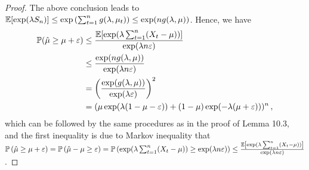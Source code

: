 \begin{proof}
    The above conclusion leads to $\mathbb{E}[\exp(\lambda S_{n})] \leq \exp\left(\sum_{t=1}^n g(\lambda, \mu_t)\right) \leq \exp(n g(\lambda, \mu))$.
    Hence, we have
    \begin{equation*}
        \begin{aligned}
            \mathbb{P}(\hat{\mu} \geq \mu+\varepsilon)
            &\leq \frac{\mathbb{E}[\exp(\lambda \sum_{t=1}^n (X_t - \mu))]}{\exp(\lambda n \varepsilon)}\\
            &\leq \frac{\exp(n g(\lambda, \mu))}{\exp(\lambda n \varepsilon)}\\
            &= \left(\frac{\exp(g(\lambda, \mu))}{\exp(\lambda \varepsilon)}\right)^2\\
            &= (\mu \exp(\lambda(1 - \mu - \varepsilon)) + (1 - \mu) \exp(-\lambda(\mu + \varepsilon)))^n \,,
        \end{aligned}
    \end{equation*}
    which can be followed by the same procedures as in the proof of Lemma 10.3, and the first inequality is due to Markov inequality that $\mathbb{P} \left(\hat{\mu} \geq \mu+\varepsilon\right)= \mathbb{P} \left(\hat{\mu} - \mu \geq \varepsilon\right) = \mathbb{P} \left(\exp(\lambda \sum_{t=1}^n (X_t - \mu)) \geq \exp(\lambda n \varepsilon)\right) \le \frac{\mathbb{E} \left[\exp(\lambda \sum_{t=1}^n (X_t - \mu))\right]}{\exp(\lambda n \varepsilon)}$. 
\end{proof}